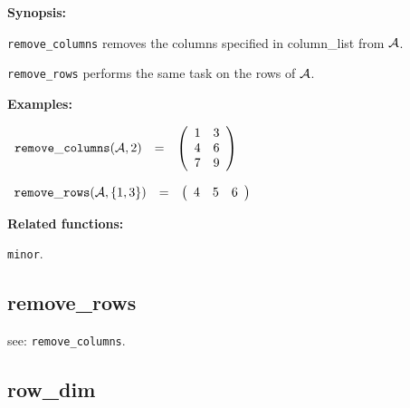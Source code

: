 {\bf Synopsis:} %

\hspace*{0.175in} {\tt remove\_columns} removes the columns specified in
                column\_list from ${\cal A}$. 

\hspace*{0.175in} {\tt remove\_rows} performs the same task on the rows 
                of ${\cal A}$.

{\bf Examples:} 

\begin{flushleft}  
\hspace*{0.1in}
\begin{math}  
\begin{array}{ccc}
{\tt remove\_columns}({\cal A},2) & = & 
        \left( \begin{array}{cc} 1 & 3 \\ 4 & 6 \\ 7 & 9  
 \end{array} \right) 
\end{array}
\end{math}  
\end{flushleft}

\vspace*{0.1in}

\begin{flushleft}  
\hspace*{0.1in}
\begin{math}  
\begin{array}{ccc}
{\tt remove\_rows}({\cal A},\{1,3\}) & = & 
        \left( \begin{array}{ccc} 4 & 5 & 6
 \end{array} \right) 
\end{array}
\end{math}  
\end{flushleft}


{\bf Related functions:}

\hspace*{0.175in} {\tt minor}.


\subsection{remove\_rows}

\hspace*{0.175in} see: {\tt remove\_columns}.


\subsection{row\_dim}


